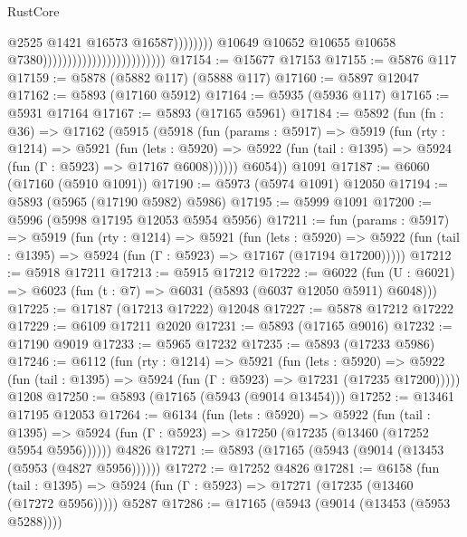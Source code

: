 \begin{lexlean}{RustCore}
\begin{coremodule}
                                                                      @2525
                                                                      @1421
                                                                      @16573
                                                                      @16587))))))))
                                                      @10649
                                                      @10652
                                                      @10655
                                                      @10658
                                                      @7380)))))))))))))))))))))))))
@17154 := @15677 @17153
@17155 := @5876 @117
@17159 := @5878 (@5882 @117) (@5888 @117)
@17160 := @5897 @12047
@17162 := @5893 (@17160 @5912)
@17164 := @5935 (@5936 @117)
@17165 := @5931 @17164
@17167 := @5893 (@17165 @5961)
@17184 := @5892
    (fun (fn : @36) =>
    @17162
      (@5915
        (@5918
          (fun (params : @5917) =>
          @5919
            (fun (rty : @1214) =>
            @5921
              (fun (lets : @5920) =>
              @5922 (fun (tail : @1395) => @5924 (fun (Γ : @5923) => @17167 @6008))))))
        @6054))
    @1091
@17187 := @6060 (@17160 (@5910 @1091))
@17190 := @5973 (@5974 @1091) @12050
@17194 := @5893 (@5965 (@17190 @5982) @5986)
@17195 := @5999 @1091
@17200 := @5996 (@5998 @17195 @12053 @5954 @5956)
@17211 := fun (params : @5917) =>
  @5919
    (fun (rty : @1214) =>
    @5921
      (fun (lets : @5920) =>
      @5922 (fun (tail : @1395) => @5924 (fun (Γ : @5923) => @17167 (@17194 @17200)))))
@17212 := @5918 @17211
@17213 := @5915 @17212
@17222 := @6022
    (fun (U : @6021) => @6023 (fun (t : @7) => @6031 (@5893 (@6037 @12050 @5911) @6048)))
@17225 := @17187 (@17213 @17222) @12048
@17227 := @5878 @17212 @17222
@17229 := @6109 @17211 @2020
@17231 := @5893 (@17165 @9016)
@17232 := @17190 @9019
@17233 := @5965 @17232
@17235 := @5893 (@17233 @5986)
@17246 := @6112
    (fun (rty : @1214) =>
    @5921
      (fun (lets : @5920) =>
      @5922 (fun (tail : @1395) => @5924 (fun (Γ : @5923) => @17231 (@17235 @17200)))))
    @1208
@17250 := @5893 (@17165 (@5943 (@9014 @13454)))
@17252 := @13461 @17195 @12053
@17264 := @6134
    (fun (lets : @5920) =>
    @5922
      (fun (tail : @1395) =>
      @5924 (fun (Γ : @5923) => @17250 (@17235 (@13460 (@17252 @5954 @5956))))))
    @4826
@17271 := @5893 (@17165 (@5943 (@9014 (@13453 (@5953 (@4827 @5956))))))
@17272 := @17252 @4826
@17281 := @6158
    (fun (tail : @1395) => @5924 (fun (Γ : @5923) => @17271 (@17235 (@13460 (@17272 @5956)))))
    @5287
@17286 := @17165 (@5943 (@9014 (@13453 (@5953 @5288))))

\end{coremodule}
\end{lexlean}
